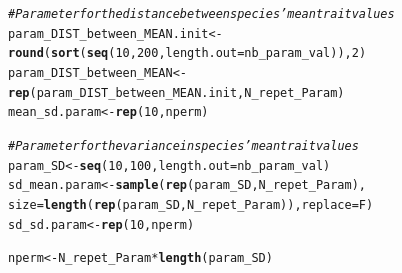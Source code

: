 \documentclass[12pt]{article}\usepackage[]{graphicx}\usepackage[]{color}
\makeatletter
\newcommand{\hlnum}[1]{\textcolor[rgb]{0.686,0.059,0.569}{#1}}%
\newcommand{\hlcom}[1]{\textcolor[rgb]{0.678,0.584,0.686}{\textit{#1}}}%
\newcommand{\hlopt}[1]{\textcolor[rgb]{0,0,0}{#1}}%
\newcommand{\hlstd}[1]{\textcolor[rgb]{0.345,0.345,0.345}{#1}}%
\newcommand{\hlkwb}[1]{\textcolor[rgb]{0.69,0.353,0.396}{#1}}%
\newcommand{\hlkwc}[1]{\textcolor[rgb]{0.333,0.667,0.333}{#1}}%
\newcommand{\hlkwd}[1]{\textcolor[rgb]{0.737,0.353,0.396}{\textbf{#1}}}%
\newenvironment{kframe}{%
 \def\at@end@of@kframe{}%
 \ifinner\ifhmode%
  \def\at@end@of@kframe{\end{minipage}}%
  \begin{minipage}{\columnwidth}%
 \fi\fi%
 \def\FrameCommand##1{\hskip\@totalleftmargin \hskip-\fboxsep
 \colorbox{shadecolor}{##1}\hskip-\fboxsep
     \hskip-\linewidth \hskip-\@totalleftmargin \hskip\columnwidth}%
 \MakeFramed {\advance\hsize-\width
   \@totalleftmargin\z@ \linewidth\hsize
   \@setminipage}}%
 {\par\unskip\endMakeFramed%
 \at@end@of@kframe}
\newenvironment{knitrout}{}{} %
\makeatother
\begin{document}
\begin{knitrout}\small
{}\color{fgcolor}\begin{kframe}
\begin{alltt}
\hlcom{# Parameter for the distance between species' mean trait values}
\hlstd{param_DIST_between_MEAN.init} \hlkwb{<-} \hlkwd{round}\hlstd{(}\hlkwd{sort}\hlstd{(}\hlkwd{seq}\hlstd{(}\hlnum{10}\hlstd{,} \hlnum{200}\hlstd{,} \hlkwc{length.out} \hlstd{= nb_param_val)),} \hlnum{2}\hlstd{)}
\hlstd{param_DIST_between_MEAN} \hlkwb{<-} \hlkwd{rep}\hlstd{(param_DIST_between_MEAN.init, N_repet_Param)}
\hlstd{mean_sd.param} \hlkwb{<-} \hlkwd{rep}\hlstd{(}\hlnum{10}\hlstd{, nperm)}

\hlcom{# Parameter for the variance in species' mean trait values}
\hlstd{param_SD} \hlkwb{<-} \hlkwd{seq}\hlstd{(}\hlnum{10}\hlstd{,} \hlnum{100}\hlstd{,}\hlkwc{length.out} \hlstd{= nb_param_val)}
\hlstd{sd_mean.param} \hlkwb{<-} \hlkwd{sample} \hlstd{(}\hlkwd{rep}\hlstd{(param_SD, N_repet_Param),}
       \hlkwc{size} \hlstd{=} \hlkwd{length}\hlstd{(}\hlkwd{rep}\hlstd{(param_SD, N_repet_Param)),} \hlkwc{replace} \hlstd{= F)}
\hlstd{sd_sd.param} \hlkwb{<-} \hlkwd{rep}\hlstd{(}\hlnum{10}\hlstd{, nperm)}

\hlstd{nperm} \hlkwb{<-} \hlstd{N_repet_Param}\hlopt{*}\hlkwd{length}\hlstd{(param_SD)}
\end{alltt}
\end{kframe}
\end{knitrout}
\end{document}
